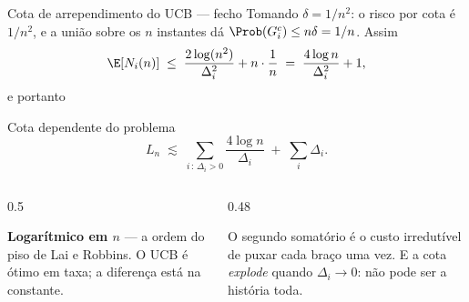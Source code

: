 \documentclass[aspectratio=169, 10pt]{beamer}
\newcommand{\Nc}{N}                         %
\newcommand{\gap}{\Delta}
\newcommand{\Reg}{L}
\begin{document}
\begin{frame}{Cota de arrependimento do UCB --- fecho}
  Tomando $\delta = 1/n^2$: o risco por cota é $1/n^2$, e a união sobre os
  $n$ instantes dá $\Prob(G_i^{c}) \le n\delta = 1/n$. Assim
  \[
    \E[\Nc_i(n)] \;\le\; \frac{2\log(n^2)}{\gap_i^2} + n \cdot \frac{1}{n}
      \;=\; \frac{4\log n}{\gap_i^2} + 1,
  \]
  e portanto

  \begin{teobox}{Cota dependente do problema}
    \[
      \Reg_n \;\lesssim\; \sum_{i \,:\, \gap_i > 0} \frac{4\log n}{\gap_i}
        \;+\; \sum_i \gap_i .
    \]
  \end{teobox}

  \begin{columns}[T]
    \begin{column}{0.5\textwidth}
      \begin{ideiabox}
        \textbf{Logarítmico em $n$} --- a ordem do piso de Lai e Robbins. O
        UCB é ótimo em taxa; a diferença está na constante.
      \end{ideiabox}
    \end{column}
    \begin{column}{0.48\textwidth}
      \begin{alertabox}
        O segundo somatório é o custo irredutível de puxar cada braço uma
        vez. E a cota \emph{explode} quando $\gap_i \to 0$: não pode ser a
        história toda.
      \end{alertabox}
    \end{column}
  \end{columns}
\end{frame}
\end{document}
